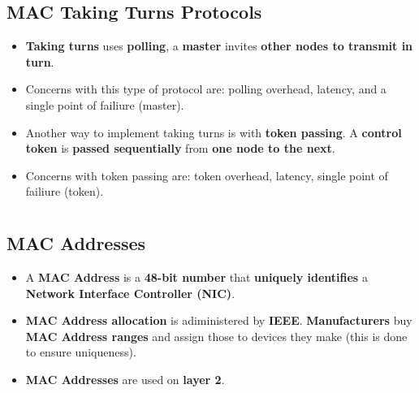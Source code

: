 \documentclass{article}
\begin{document}
    \subsection*{MAC Taking Turns Protocols}
    \begin{itemize}
        \item \textbf{Taking turns} uses \textbf{polling}, a \textbf{master} invites \textbf{other nodes to transmit in turn}.
        \item Concerns with this type of protocol are: polling overhead, latency, and a single point of failiure (master).
        \item Another way to implement taking turns is with \textbf{token passing}. A \textbf{control token} is \textbf{passed sequentially} from \textbf{one node to the next}.
        \item Concerns with token passing are: token overhead, latency, single point of failiure (token).
    \end{itemize}

    \section*{}

    \subsection*{MAC Addresses}
    \begin{itemize}
        \item A \textbf{MAC Address} is a \textbf{48-bit number} that \textbf{uniquely identifies} a \textbf{Network Interface Controller (NIC)}.
        \item \textbf{MAC Address allocation} is adiministered by \textbf{IEEE}. \textbf{Manufacturers} buy \textbf{MAC Address ranges} and assign those to devices they make (this is done to ensure uniqueness).
        \item \textbf{MAC Addresses} are used on \textbf{layer 2}.
    \end{itemize}
\end{document}
